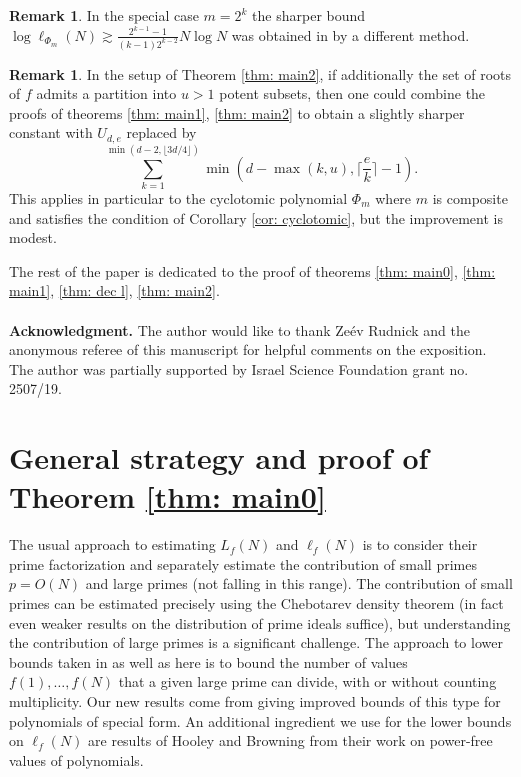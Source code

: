 \documentclass[alphabetic]{amsart}
\theoremstyle{definition}
\newtheorem{rem}[claim]{Remark}
\numberwithin{equation}{section}
\numberwithin{equation}{section}
\begin{document}
\begin{rem} In the special case $m=2^k$ the sharper bound $\log \ell_{\Phi_m}(N)\gtrsim \frac{2^{k-1}-1}{(k-1)2^{k-2}}N\log N$ was obtained in \cite{Tec24_1} by a different method.\end{rem}
\begin{rem} In the setup of Theorem \ref{thm: main2}, if additionally the set of roots of $f$ admits a partition into $u>1$ potent subsets, then one could combine the proofs of theorems \ref{thm: main1}, \ref{thm: main2} to obtain a slightly sharper constant with $U_{d,e}$ replaced by
$$\sum_{k=1}^{\min(d-2,\lfloor 3d/4\rfloor)}\min \left(d-\max(k,u),\bigg\lceil\frac {e}k\bigg\rceil-1\right).$$
This applies in particular to the cyclotomic polynomial $\Phi_m$ where $m$ is composite and satisfies the condition of Corollary \ref{cor: cyclotomic}, but the improvement is modest.
\end{rem}
The rest of the paper is dedicated to the proof of theorems \ref{thm: main0}, \ref{thm: main1}, \ref{thm: dec l}, \ref{thm: main2}.
\\ \\
{\bf Acknowledgment.} The author would like to thank Ze\'ev Rudnick and the anonymous referee of this manuscript for helpful comments on the exposition. The author was partially supported by Israel Science Foundation grant no. 2507/19.



\section{General strategy and proof of Theorem \ref{thm: main0}}

The usual approach to estimating $L_f(N)$ and $\ell_f(N)$ is to consider their prime factorization and separately estimate the contribution of small primes $p=O(N)$ and large primes (not falling in this range). The contribution of small primes can be estimated precisely using the Chebotarev density theorem (in fact even weaker results on the distribution of prime ideals suffice), but understanding the contribution of large primes is a significant challenge. The approach to lower bounds taken in \cite{MaRu21, Sah20} as well as here is to bound the number of values $f(1),\ldots,f(N)$ that a given large prime can divide, with or without counting multiplicity. Our new results come from giving improved bounds of this type for polynomials of special form. An additional ingredient we use for the lower bounds on $\ell_f(N)$ are results of Hooley \cite{Hoo67} and Browning \cite{Bro11} from their work on power-free values of polynomials.
\end{document}
